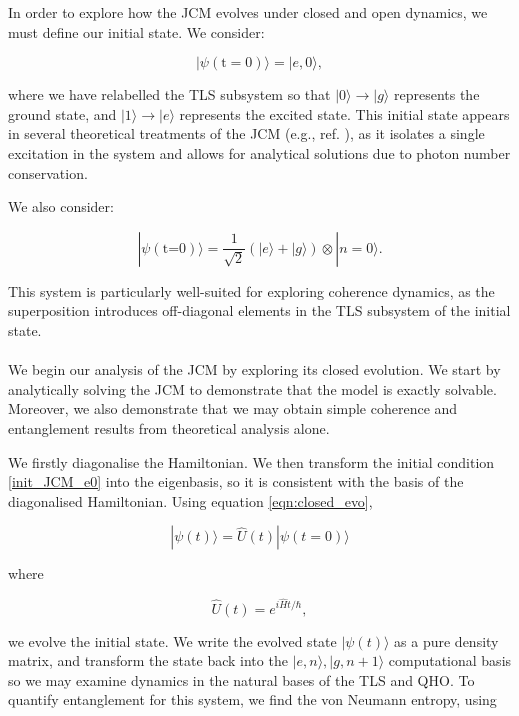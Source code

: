 \documentclass[11pt]{article}
\begin{document}
In order to explore how the JCM evolves under closed and open dynamics, we must define our initial state. We consider:

\begin{equation} \label{init_JCM_e0}
    |\psi (\text{t}=0)\rangle = |e, 0\rangle,
\end{equation}

where we have relabelled the TLS subsystem so that $|0\rangle \rightarrow|g\rangle$ represents the ground state, and $|1\rangle \rightarrow |e\rangle$ represents the excited state. This initial state appears in several theoretical treatments of the JCM (e.g., ref. \cite{Entanglement2009-REE_VNapplied}), as it isolates a single excitation in the system and allows for analytical solutions due to photon number conservation.

We also consider:

\begin{equation} \label{init_JCM_e0g0}
    |\psi (\text{t=0})\rangle = \frac{1}{\sqrt{2}}(|e\rangle + |g\rangle)\otimes|n=0\rangle.
\end{equation}

This system is particularly well-suited for exploring coherence dynamics, as the superposition introduces off-diagonal elements in the TLS subsystem of the initial state.\\
\\
We begin our analysis of the JCM by exploring its closed evolution. We start by analytically solving the JCM to demonstrate that the model is exactly solvable. Moreover, we also demonstrate that we may obtain simple coherence and entanglement results from theoretical analysis alone. 

We firstly diagonalise the Hamiltonian. We then transform the initial condition \eqref{init_JCM_e0} into the eigenbasis, so it is consistent with the basis of the diagonalised Hamiltonian. Using equation \eqref{eqn:closed_evo},

\begin{equation*} 
    |\psi(t)\rangle = \hat{U}(t)|\psi(t=0)\rangle
\end{equation*}

where 

\begin{equation*}
    \hat{U}(t) = e^{i\hat{H}t/\hbar},
\end{equation*}

we evolve the initial state. We write the evolved state $|\psi(t)\rangle$ as a pure density matrix, and transform the state back into the $|e, n\rangle, |g,n+1\rangle$ computational basis so we may examine dynamics in the natural bases of the TLS and QHO. To quantify entanglement for this system, we find the von Neumann entropy, using
\end{document}
